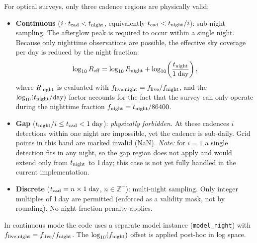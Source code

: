 \documentclass[11pt,a4paper]{article}
\begin{document}
For optical surveys, only three cadence regions are physically valid:
\begin{itemize}
\item \textbf{Continuous} ($i\cdot t_{\rm cad}<t_{\rm night}$, equivalently $t_{\rm cad}<t_{\rm night}/i$): sub-night sampling.
  The afterglow peak is required to occur within a single night.
  Because only nighttime observations are possible, the effective sky coverage per day is reduced by the night fraction:
  \[
  \log_{10}R_{\rm eff} = \log_{10}R_{\rm night} + \log_{10}\!\left(\frac{t_{\rm night}}{1\;\text{day}}\right),
  \]
  where $R_{\rm night}$ is evaluated with $f_{\rm live,night}=f_{\rm live}/f_{\rm night}$, and the $\log_{10}(t_{\rm night}/\text{day})$ factor accounts for the fact that the survey can only operate during the nighttime fraction $f_{\rm night}=t_{\rm night}/86400$.

\item \textbf{Gap} ($t_{\rm night}/i\le t_{\rm cad}<1\;\text{day}$): \emph{physically forbidden.}
  At these cadences $i$ detections within one night are impossible, yet the cadence is sub-daily.
  Grid points in this band are marked invalid (NaN).
  \emph{Note:} for $i=1$ a single detection fits in any night, so the gap region does not apply and would extend only from $t_{\rm night}$ to 1\,day; this case is not yet fully handled in the current implementation.

\item \textbf{Discrete} ($t_{\rm cad}=n\times1\;\text{day}$, $n\in\mathbb{Z}^+$): multi-night sampling.
  Only integer multiples of 1\,day are permitted (enforced as a validity mask, not by rounding).
  No night-fraction penalty applies.
\end{itemize}

\noindent In continuous mode the code uses a separate model instance (\texttt{model\_night}) with $f_{\rm live,night}=f_{\rm live}/f_{\rm night}$. The $\log_{10}(f_{\rm night})$ offset is applied post-hoc in log space.
\end{document}
